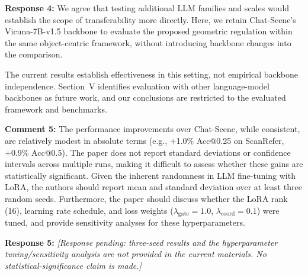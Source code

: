 \noindent\textbf{Response 4:}
We agree that testing additional LLM families and scales would establish the scope of transferability more directly. Here, we retain Chat-Scene's Vicuna-7B-v1.5 backbone to evaluate the proposed geometric regulation within the same object-centric framework, without introducing backbone changes into the comparison.

The current results establish effectiveness in this setting, not empirical backbone independence. Section~V identifies evaluation with other language-model backbones as future work, and our conclusions are restricted to the evaluated framework and benchmarks.
\vspace{\resafter}


{\noindent\color{comment}
\textbf{Comment 5:}
The performance improvements over Chat-Scene, while consistent, are relatively modest in absolute terms (e.g., +1.0\% Acc@0.25 on ScanRefer, +0.9\% Acc@0.5). The paper does not report standard deviations or confidence intervals across multiple runs, making it difficult to assess whether these gains are statistically significant. Given the inherent randomness in LLM fine-tuning with LoRA, the authors should report mean and standard deviation over at least three random seeds. Furthermore, the paper should discuss whether the LoRA rank (16), learning rate schedule, and loss weights ($\lambda_{\mathrm{gate}}=1.0$, $\lambda_{\mathrm{coord}}=0.1$) were tuned, and provide sensitivity analyses for these hyperparameters.
}\vspace{\comafter}

\noindent\textbf{Response 5:}
\textit{[Response pending: three-seed results and the hyperparameter tuning/sensitivity analysis are not provided in the current materials. No statistical-significance claim is made.]}
\vspace{\resafter}

